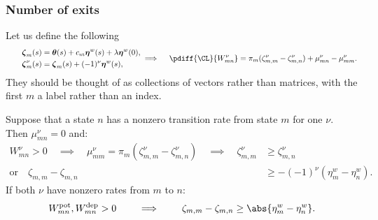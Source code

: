 \documentclass[12pt]{article}
\newcommand{\eqm}{\pi}
\newcommand{\etwm}{\eta^w}
\newcommand{\etw}{\boldsymbol{\eta}^w}
\newcommand{\thbm}{\theta}
\newcommand{\thb}{\boldsymbol{\thbm}}
\newcommand{\dgnm}{\zeta}
\newcommand{\dgn}{\boldsymbol{\dgnm}}
\newcommand{\Wm}{W}
\newcommand{\kktm}{\mu}
\newcommand{\pot}{^{\text{pot}}}
\newcommand{\dep}{^{\text{dep}}}
\begin{document}

\subsubsection{Number of exits}\label{sec:exit}

Let us define the following
%
\begin{equation}\label{eq:degenerate}
\begin{aligned}
    \dgn_{m}(s) &= \thb(s) + c_m \etw(s) + \lambda \etw(0), \\
    \qquad
    \dgn^\nu_m(s) &= \dgn_m(s) + (-1)^\nu \etw(s),   
\end{aligned}
  \implies \quad
  \pdiff{\CL}{\Wm^\nu_{mn}} = \eqm_m (\dgnm^\nu_{m,m} - \dgnm^\nu_{m,n}) + \kktm^\nu_{mn} - \kktm^\nu_{mm}.
\end{equation}
%
They should be thought of as collections of vectors rather than matrices, with the first \(m\) a label rather than an index.

Suppose that a state \(n\) has a nonzero transition rate from state \(m\) for one \(\nu\).
Then \(\kktm^\nu_{mn} = 0\) and:
%
\begin{equation}\label{eq:oneexit}
\begin{aligned}
  \Wm^\nu_{mn} > 0
  \quad \implies \quad
  \kktm^\nu_{mm} = \eqm_m (\dgnm^\nu_{m,m} - \dgnm^\nu_{m,n})
  \quad \implies \quad
  \dgnm^\nu_{m,m} &\geq \dgnm^\nu_{m,n} \\
  \text{or} \quad
  \dgnm_{m,m} - \dgnm_{m,n} &\geq - (-1)^\nu (\etwm_m - \etwm_n).
\end{aligned}
\end{equation}
%
If both \(\nu\) have nonzero rates from \(m\) to \(n\):
%
\begin{equation}\label{eq:doubleexit}
  \Wm\pot_{mn}, \Wm\dep_{mn} > 0
  \qquad \implies \qquad
  \dgnm_{m,m} - \dgnm_{m,n} \geq \abs{\etwm_m - \etwm_n}.
\end{equation}
%
\end{document}
